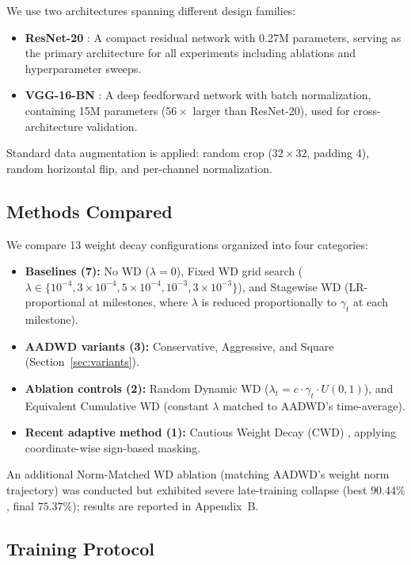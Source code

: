 \documentclass{article}
\begin{document}
We use two architectures spanning different design families:
\begin{itemize}
  \item \textbf{ResNet-20} \citep{he2016deep}: A compact residual network with
        0.27M parameters, serving as the primary architecture for all experiments
        including ablations and hyperparameter sweeps.
  \item \textbf{VGG-16-BN} \citep{simonyan2015very}: A deep feedforward network with
        batch normalization, containing 15M parameters ($56\times$ larger than
        ResNet-20), used for cross-architecture validation.
\end{itemize}

Standard data augmentation is applied: random crop ($32 \times 32$, padding 4),
random horizontal flip, and per-channel normalization.

\subsection{Methods Compared}

We compare 13 weight decay configurations organized into four categories:
\begin{itemize}
  \item \textbf{Baselines (7):} No WD ($\lambda = 0$),
        Fixed WD grid search
        ($\lambda \in \{10^{-4}, 3 \times 10^{-4}, 5 \times 10^{-4}, 10^{-3},
        3 \times 10^{-3}\}$),
        and Stagewise WD (LR-proportional at milestones, where $\lambda$ is reduced
        proportionally to $\gamma_t$ at each milestone).
  \item \textbf{AADWD variants (3):} Conservative, Aggressive, and Square
        (Section~\ref{sec:variants}).
  \item \textbf{Ablation controls (2):} Random Dynamic WD
        ($\lambda_t = c \cdot \gamma_t \cdot U(0,1)$), and Equivalent Cumulative WD
        (constant $\lambda$ matched to AADWD's time-average).
  \item \textbf{Recent adaptive method (1):} Cautious Weight Decay
        (CWD) \citep{liu2025cautious}, applying coordinate-wise sign-based masking.
\end{itemize}

\noindent
An additional Norm-Matched WD ablation (matching AADWD's weight norm trajectory) was
conducted but exhibited severe late-training collapse (best $90.44\%$, final
$75.37\%$); results are reported in Appendix~B.

\subsection{Training Protocol}
\end{document}

